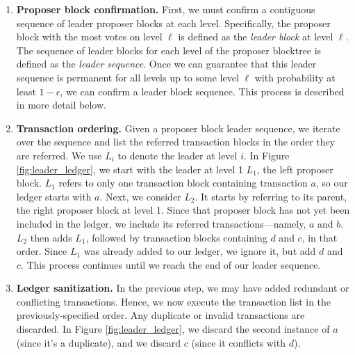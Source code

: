 \begin{enumerate}
    \item  \textbf{Proposer block confirmation.} First, we must confirm a contiguous sequence of leader proposer blocks at each level.  
    Specifically, the proposer block with the most votes on level $\ell$ is defined as the \textit{leader block} at level $\ell$. 
The sequence of leader blocks for each level of the proposer blocktree is defined as the {\em leader sequence}. 
Once we can guarantee that this leader sequence is permanent for all levels up to some level $\ell$ with probability at least $1-\epsilon$, we can confirm a leader block sequence. This process is described in more detail below.
    \item \textbf{Transaction  ordering.} 
    Given a proposer block leader sequence, we iterate over the sequence and list the referred transaction blocks in the  order they are referred. 
    We use $L_i$ to denote the leader at level $i$. 
    In Figure \ref{fig:leader_ledger}, we  start  with the leader at level 1 $L_1$, the left proposer block.
    $L_1$ refers to only one transaction  block containing transaction $a$, so our ledger starts with $a$.
    Next, we consider $L_2$. It starts by referring to its parent, the right proposer block at level 1.
    Since that proposer block has not yet been included in the ledger, we include its referred transactions---namely, $a$ and $b$. 
    $L_2$ then adds $L_1$, followed by transaction blocks containing $d$ and $c$, in that order.
    Since $L_1$ was already added to our ledger, we ignore it, but add $d$ and $c$.
    This process continues until we reach the end of our leader sequence.
    \item \textbf{Ledger sanitization.} In the previous step, we may have added redundant or conflicting transactions. 
    Hence, we now execute the transaction list in the previously-specified order. Any duplicate or invalid transactions are discarded. 
    In Figure \ref{fig:leader_ledger}, we discard the second instance of $a$ (since it's a duplicate), and we discard $c$ (since it conflicts with $d$).
\end{enumerate}

\fi
   



